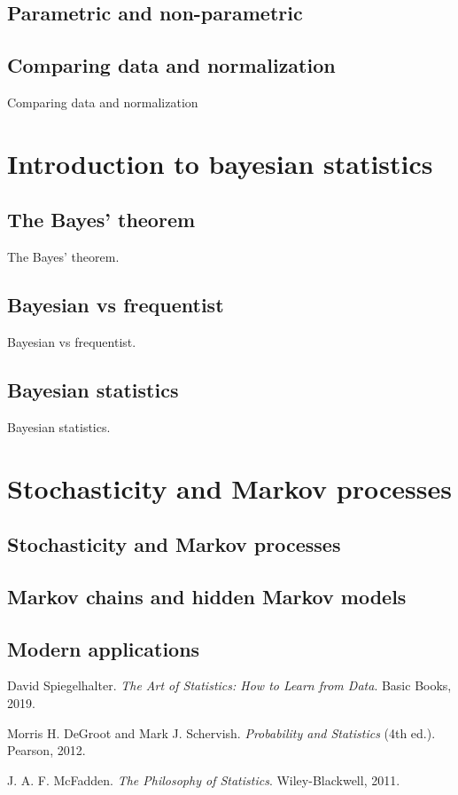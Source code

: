 \documentclass{book}
\begin{document}
\section{Parametric and non-parametric}

\section{Comparing data and normalization}
Comparing data and normalization

\chapter{Introduction to bayesian statistics}

\section{The Bayes' theorem}
The Bayes' theorem.

\section{Bayesian vs frequentist}
Bayesian vs frequentist.

\section{Bayesian statistics}
Bayesian statistics.


\chapter{Stochasticity and Markov processes}

\section{Stochasticity and Markov processes}

\section{Markov chains and hidden Markov models}

\section{Modern applications}


\backmatter
 
\begin{thebibliography}{999}

David Spiegelhalter. 
\textit{The Art of Statistics: How to Learn from Data}. 
Basic Books, 2019.

Morris H. DeGroot and Mark J. Schervish.
\textit{Probability and Statistics} (4th ed.).
Pearson, 2012.

J. A. F. McFadden.
\textit{The Philosophy of Statistics}.
Wiley-Blackwell, 2011.

\end{thebibliography}
\end{document}

